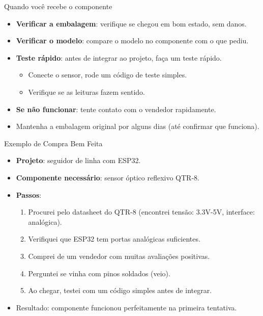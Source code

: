 \documentclass[10pt]{beamer}
\begin{document}
\begin{frame}{Quando você recebe o componente}
  \begin{itemize}
    \item \textbf{Verificar a embalagem}: verifique se chegou em bom estado, sem danos.
    \item \textbf{Verificar o modelo}: compare o modelo no componente com o que pediu.
    \item \textbf{Teste rápido}: antes de integrar ao projeto, faça um teste rápido.
    \begin{itemize}
      \item Conecte o sensor, rode um código de teste simples.
      \item Verifique se as leituras fazem sentido.
    \end{itemize}
    \item \textbf{Se não funcionar}: tente contato com o vendedor rapidamente.
    \item Mantenha a embalagem original por alguns dias (até confirmar que funciona).
  \end{itemize}
\end{frame}

\begin{frame}{Exemplo de Compra Bem Feita}
  \begin{itemize}
    \item \textbf{Projeto}: seguidor de linha com ESP32.
    \item \textbf{Componente necessário}: sensor óptico reflexivo QTR-8.
    \item \textbf{Passos}:
    \begin{enumerate}
      \item Procurei pelo datasheet do QTR-8 (encontrei tensão: 3.3V-5V, interface: analógica).
      \item Verifiquei que ESP32 tem portas analógicas suficientes.
      \item Comprei de um vendedor com muitas avaliações positivas.
      \item Perguntei se vinha com pinos soldados (veio).
      \item Ao chegar, testei com um código simples antes de integrar.
    \end{enumerate}
    \item Resultado: componente funcionou perfeitamente na primeira tentativa.
  \end{itemize}
\end{frame}
\end{document}
